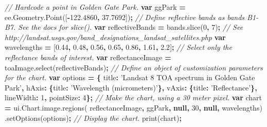 \documentclass[
]{article}
\newenvironment{Shaded}{\begin{snugshade}}{\end{snugshade}}
\newcommand{\AttributeTok}[1]{\textcolor[rgb]{0.77,0.63,0.00}{#1}}
\newcommand{\CommentTok}[1]{\textcolor[rgb]{0.56,0.35,0.01}{\textit{#1}}}
\newcommand{\DataTypeTok}[1]{\textcolor[rgb]{0.13,0.29,0.53}{#1}}
\newcommand{\DecValTok}[1]{\textcolor[rgb]{0.00,0.00,0.81}{#1}}
\newcommand{\FloatTok}[1]{\textcolor[rgb]{0.00,0.00,0.81}{#1}}
\newcommand{\KeywordTok}[1]{\textcolor[rgb]{0.13,0.29,0.53}{\textbf{#1}}}
\newcommand{\NormalTok}[1]{#1}
\newcommand{\OperatorTok}[1]{\textcolor[rgb]{0.81,0.36,0.00}{\textbf{#1}}}
\newcommand{\StringTok}[1]{\textcolor[rgb]{0.31,0.60,0.02}{#1}}
\newcommand{\VariableTok}[1]{\textcolor[rgb]{0.00,0.00,0.00}{#1}}
\begin{document}
\begin{enumerate}
\begin{Shaded}
\begin{Highlighting}[]
\CommentTok{//  Hardcode a point in Golden Gate Park.   }
\KeywordTok{var}\NormalTok{ ggPark }\OperatorTok{=} \VariableTok{ee}\NormalTok{.}\VariableTok{Geometry}\NormalTok{.}\AttributeTok{Point}\NormalTok{([}\OperatorTok{-}\FloatTok{122.4860}\OperatorTok{,} \FloatTok{37.7692}\NormalTok{])}\OperatorTok{;}      
\CommentTok{// Define reflective  bands as bands B1-B7. See the docs for slice().   }
\KeywordTok{var}\NormalTok{ reflectiveBands }\OperatorTok{=} \VariableTok{bands}\NormalTok{.}\AttributeTok{slice}\NormalTok{(}\DecValTok{0}\OperatorTok{,} \DecValTok{7}\NormalTok{)}\OperatorTok{;}      
\CommentTok{// See  http://landsat.usgs.gov/band_designations_landsat_satellites.php   }
\KeywordTok{var}\NormalTok{ wavelengths }\OperatorTok{=}\NormalTok{ [}\FloatTok{0.44}\OperatorTok{,} \FloatTok{0.48}\OperatorTok{,} \FloatTok{0.56}\OperatorTok{,} \FloatTok{0.65}\OperatorTok{,} \FloatTok{0.86}\OperatorTok{,} \FloatTok{1.61}\OperatorTok{,} \FloatTok{2.2}\NormalTok{]}\OperatorTok{;}      
\CommentTok{// Select only the  reflectance bands of interest.   }
\KeywordTok{var}\NormalTok{ reflectanceImage }\OperatorTok{=}  \VariableTok{toaImage}\NormalTok{.}\AttributeTok{select}\NormalTok{(reflectiveBands)}\OperatorTok{;}      
\CommentTok{// Define an object of  customization parameters for the chart.   }
\KeywordTok{var}\NormalTok{ options }\OperatorTok{=} \OperatorTok{\{}
  \DataTypeTok{title}\OperatorTok{:} \StringTok{'Landsat  8 TOA spectrum in Golden Gate Park'}\OperatorTok{,}    
               \DataTypeTok{hAxis}\OperatorTok{:} \OperatorTok{\{}\DataTypeTok{title}\OperatorTok{:} \StringTok{'Wavelength  (micrometers)'}\OperatorTok{\},}
               \DataTypeTok{vAxis}\OperatorTok{:} \OperatorTok{\{}\DataTypeTok{title}\OperatorTok{:} \StringTok{'Reflectance'}\OperatorTok{\},}
               \DataTypeTok{lineWidth}\OperatorTok{:} \DecValTok{1}\OperatorTok{,}
               \DataTypeTok{pointSize}\OperatorTok{:} \DecValTok{4}\OperatorTok{\};}      
\CommentTok{// Make the chart, using  a 30 meter pixel.   }
\KeywordTok{var}\NormalTok{ chart }\OperatorTok{=} \VariableTok{ui}\NormalTok{.}\VariableTok{Chart}\NormalTok{.}\VariableTok{image}\NormalTok{.}\AttributeTok{regions}\NormalTok{(}
\NormalTok{  reflectanceImage}\OperatorTok{,} 
\NormalTok{  ggPark}\OperatorTok{,} \KeywordTok{null}\OperatorTok{,} \DecValTok{30}\OperatorTok{,} \KeywordTok{null}\OperatorTok{,}\NormalTok{ wavelengths)}
\NormalTok{        .}\AttributeTok{setOptions}\NormalTok{(options)}\OperatorTok{;}      
\CommentTok{// Display the chart.   }
\AttributeTok{print}\NormalTok{(chart)}\OperatorTok{;}  
\end{Highlighting}
\end{Shaded}
\end{enumerate}
\end{document}
